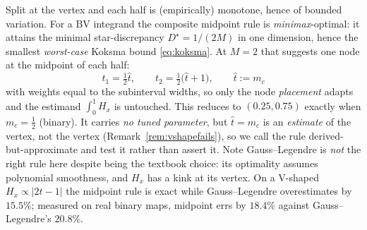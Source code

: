 \documentclass[11pt]{article}
\theoremstyle{remark}
\begin{document}
Split at the vertex and each half is (empirically) monotone, hence of bounded
variation. For a BV integrand the composite midpoint rule is \emph{minimax}-optimal: it
attains the minimal star-discrepancy $D^\star = 1/(2M)$ in one dimension, hence the
smallest \emph{worst-case} Koksma bound \eqref{eq:koksma}. At $M=2$ that suggests one
node at the midpoint of each half:
\begin{equation}\label{eq:derivednodes}
\boxed{\; t_1 = \tfrac{1}{2}\hat{t}, \qquad t_2 = \tfrac{1}{2}\big(\hat{t} + 1\big),
\qquad \hat{t} := m_c \;}
\end{equation}
with weights equal to the subinterval widths, so only the node \emph{placement}
adapts and the estimand $\int_0^1 H_x$ is untouched. This reduces to $(0.25, 0.75)$
exactly when $m_c = \tfrac12$ (binary). It carries \emph{no tuned parameter}, but
$\hat{t} = m_c$ is an \emph{estimate} of the vertex, not the vertex
(Remark~\ref{rem:vshapefails}), so we call the rule derived-but-approximate and test
it rather than assert it. Note Gauss--Legendre is \emph{not} the right rule here despite
being the textbook choice: its optimality assumes polynomial smoothness, and $H_x$ has
a kink at its vertex. On a V-shaped $H_x \propto |2t-1|$ the midpoint rule is exact
while Gauss--Legendre overestimates by $15.5\%$; measured on real binary maps, midpoint
errs by $18.4\%$ against Gauss--Legendre's $20.8\%$.
\end{document}
